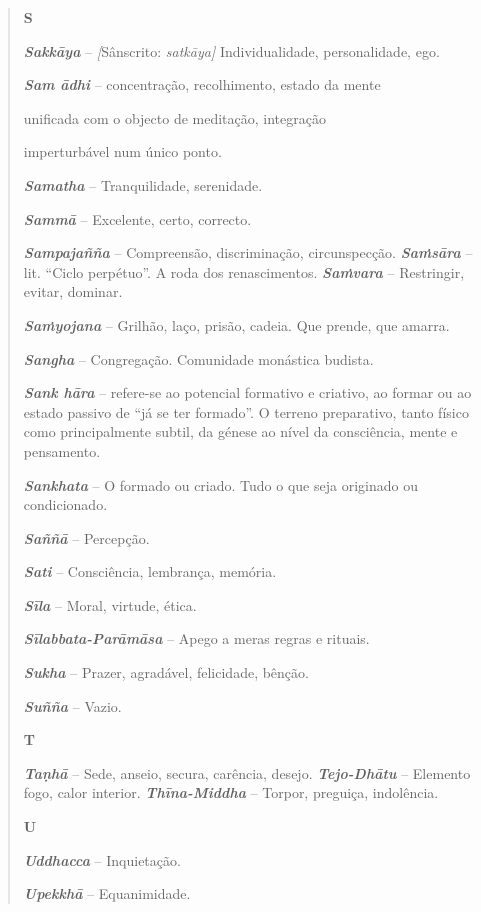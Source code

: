 \begin{quote}
\textbf{S}

\emph{\textbf{Sakkāya}} -- \emph{{[}}Sânscrito: \emph{satkāya{]}} Individualidade, personalidade, ego.

\emph{\textbf{Sam ādhi}} -- concentração, recolhimento, estado da mente

unificada com o objecto de meditação, integração

imperturbável num único ponto.

\emph{\textbf{Samatha}} -- Tranquilidade, serenidade.

\emph{\textbf{Sammā}} -- Excelente, certo, correcto.

\emph{\textbf{Sampajañña}} -- Compreensão, discriminação, circunspecção. \emph{\textbf{Saṁsāra}} -- lit. ``Ciclo perpétuo''. A roda dos renascimentos. \emph{\textbf{Saṁvara}} -- Restringir, evitar, dominar.

\emph{\textbf{Saṁyojana}} -- Grilhão, laço, prisão, cadeia. Que prende, que amarra.

\emph{\textbf{Sangha}} -- Congregação. Comunidade monástica budista.

\emph{\textbf{Sank hāra}} -- refere-se ao potencial formativo e criativo, ao formar ou ao estado passivo de ``já se ter formado''. O terreno preparativo, tanto físico como principalmente subtil, da génese ao nível da consciência, mente e pensamento.

\emph{\textbf{Sankhata}} -- O formado ou criado. Tudo o que seja originado ou condicionado.

\emph{\textbf{Saññā}} -- Percepção.

\emph{\textbf{Sati}} -- Consciência, lembrança, memória.

\emph{\textbf{Sīla}} -- Moral, virtude, ética.

\emph{\textbf{Sīlabbata-Parāmāsa}} -- Apego a meras regras e rituais.

\emph{\textbf{Sukha}} -- Prazer, agradável, felicidade, bênção.

\emph{\textbf{Suñña}} -- Vazio.

\textbf{T}

\emph{\textbf{Taṇhā}} -- Sede, anseio, secura, carência, desejo. \emph{\textbf{Tejo-Dhātu}} -- Elemento fogo, calor interior. \emph{\textbf{Thīna-Middha}} -- Torpor, preguiça, indolência.

\textbf{U}

\emph{\textbf{Uddhacca}} -- Inquietação.

\emph{\textbf{Upekkhā}} -- Equanimidade.


\end{quote}
